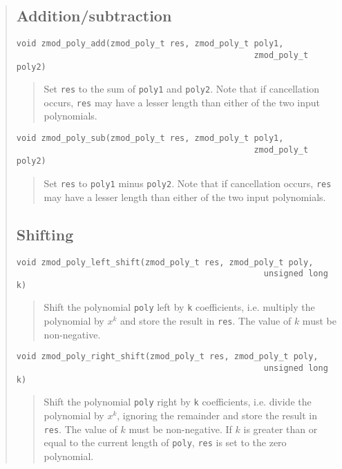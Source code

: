 \documentclass[a4paper,10pt]{article}
\newcommand{\code}{\lstinline}
\begin{document}
\begin{quote}
\subsection{Addition/subtraction}
\begin{lstlisting}
void zmod_poly_add(zmod_poly_t res, zmod_poly_t poly1, 
                                                zmod_poly_t poly2)
\end{lstlisting}
\begin{quote}
Set \code{res} to the sum of \code{poly1} and \code{poly2}. Note that if cancellation occurs, \code{res} may have a lesser length than either of the two input polynomials.
\end{quote}

\begin{lstlisting}
void zmod_poly_sub(zmod_poly_t res, zmod_poly_t poly1, 
                                                zmod_poly_t poly2)
\end{lstlisting}
\begin{quote}
Set \code{res} to \code{poly1} minus \code{poly2}. Note that if cancellation occurs, \code{res} may have a lesser length than either of the two input polynomials.
\end{quote}

\subsection{Shifting}
\begin{lstlisting}
void zmod_poly_left_shift(zmod_poly_t res, zmod_poly_t poly, 
                                                  unsigned long k)
\end{lstlisting}
\begin{quote}
Shift the polynomial \code{poly} left by \code{k} coefficients, i.e. multiply the polynomial by $x^k$ and store the result in \code{res}. The value of $k$ must be non-negative.
\end{quote}

\begin{lstlisting}
void zmod_poly_right_shift(zmod_poly_t res, zmod_poly_t poly, 
                                                  unsigned long k)
\end{lstlisting}
\begin{quote}
Shift the polynomial \code{poly} right by \code{k} coefficients, i.e. divide the polynomial by $x^k$, ignoring the remainder and store the result in \code{res}. The value of $k$ must be non-negative. If $k$ is greater than or equal to the current length of \code{poly}, \code{res} is set to the zero polynomial.
\end{quote}


\end{quote}
\end{document}
